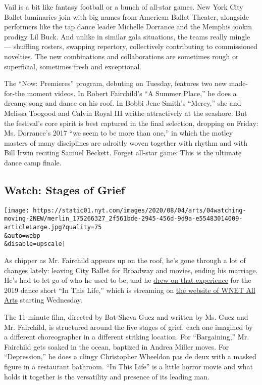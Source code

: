 Vail is a bit like fantasy football or a bunch of all-star games. New
York City Ballet luminaries join with big names from American Ballet
Theater, alongside performers like the tap dance leader Michelle
Dorrance and the Memphis jookin prodigy Lil Buck. And unlike in similar
gala situations, the teams really mingle --- shuffling rosters, swapping
repertory, collectively contributing to commissioned novelties. The new
combinations and collaborations are sometimes rough or superficial,
sometimes fresh and exceptional.

The ``Now: Premieres'' program, debuting on Tuesday, features two new
made-for-the moment videos. In Robert Fairchild's ``A Summer Place,'' he
does a dreamy song and dance on his roof. In Bobbi Jene Smith's
``Mercy,'' she and Melissa Toogood and Calvin Royal III writhe
attractively at the seashore. But the festival's core spirit is best
captured in the final selection, dropping on Friday: Ms. Dorrance's 2017
``we seem to be more than one,'' in which the motley masters of many
disciplines are adroitly woven together with rhythm and with Bill Irwin
reciting Samuel Beckett. Forget all-star game: This is the ultimate
dance camp finale.

\hypertarget{watch-stages-of-grief}{%
\subsection{Watch: Stages of Grief}\label{watch-stages-of-grief}}

\texttt{[image: https://static01.nyt.com/images/2020/08/04/arts/04watching-moving-2NEW/merlin\_175266327\_2f561bde-2945-456d-9d9a-e55483014009-articleLarge.jpg?quality=75\\\&auto=webp\\\&disable=upscale]}

As chipper as Mr. Fairchild appears up on the roof, he's gone through a
lot of changes lately: leaving City Ballet for Broadway and movies,
ending his marriage. He's had to let go of who he used to be, and he
\href{https://www.dancemagazine.com/robbie-fairchild-short-film-2639173287.html?rebelltitem=5\#rebelltitem5}{drew
on that experience} for the 2019 dance short ``In This Life,'' which is
streaming on
\href{https://allarts.org/programs/all-arts-performance-selects/life-fvtylu/}{the
website of WNET All Arts} starting Wednesday.

The 11-minute film, directed by Bat-Sheva Guez and written by Ms. Guez
and Mr. Fairchild, is structured around the five stages of grief, each
one imagined by a different choreographer in a different striking
location. For ``Bargaining,'' Mr. Fairchild gets soaked in the ocean,
baptized in Andrea Miller moves. For ``Depression,'' he does a clingy
Christopher Wheeldon pas de deux with a masked figure in a restaurant
bathroom. ``In This Life'' is a little horror movie and what holds it
together is the versatility and presence of its leading man.

